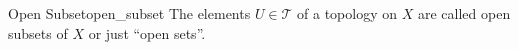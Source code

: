 \begin{definition}{Open Subset}{open_subset}
The elements \( U \in  \mathcal{ T }   \) of a topology on \( X \) are called
open subsets of \( X \) or just ``open sets''.
\end{definition}
